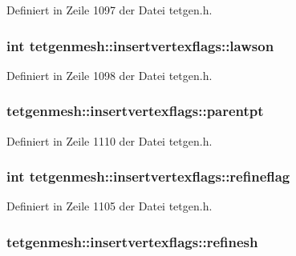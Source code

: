Definiert in Zeile 1097 der Datei tetgen.\-h.

\hypertarget{classtetgenmesh_1_1insertvertexflags_a932694f9cfa9b5a20d3ee632c5cb4f0b}{
\subsubsection[{lawson}]{\setlength{\rightskip}{0pt plus 5cm}int tetgenmesh\-::insertvertexflags\-::lawson}}\label{classtetgenmesh_1_1insertvertexflags_a932694f9cfa9b5a20d3ee632c5cb4f0b}


Definiert in Zeile 1098 der Datei tetgen.\-h.

\hypertarget{classtetgenmesh_1_1insertvertexflags_a7b72ad9649e1b63ed22bbf70e9b9d41a}{
\subsubsection[{parentpt}]{ tetgenmesh\-::insertvertexflags\-::parentpt}}\label{classtetgenmesh_1_1insertvertexflags_a7b72ad9649e1b63ed22bbf70e9b9d41a}


Definiert in Zeile 1110 der Datei tetgen.\-h.

\hypertarget{classtetgenmesh_1_1insertvertexflags_a13e91034cabc919adca3823de54de22d}{
\subsubsection[{refineflag}]{\setlength{\rightskip}{0pt plus 5cm}int tetgenmesh\-::insertvertexflags\-::refineflag}}\label{classtetgenmesh_1_1insertvertexflags_a13e91034cabc919adca3823de54de22d}


Definiert in Zeile 1105 der Datei tetgen.\-h.

\hypertarget{classtetgenmesh_1_1insertvertexflags_a5caa7334d56feac9a16021de6b8e2bea}{
\subsubsection[{refinesh}]{ tetgenmesh\-::insertvertexflags\-::refinesh}}\label{classtetgenmesh_1_1insertvertexflags_a5caa7334d56feac9a16021de6b8e2bea}


